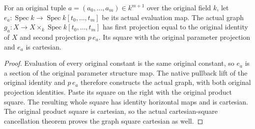 \begin{lemma}
\label{lem:kn-nadel-bertini-evaluation-graph}
\leanok
{}
For an original tuple $a=(a_0,\ldots,a_m)\in k^{m+1}$ over the
original field $k$, let
$e_a:\operatorname{Spec}k\to\operatorname{Spec}k[t_0,\ldots,t_m]$
be its actual evaluation map. The actual graph
$g_a:X\to X\times_k\operatorname{Spec}k[t_0,\ldots,t_m]$ has first
projection equal to the original identity of $X$ and second projection
$p\,e_a$. Its square with the original parameter projection and $e_a$ is
cartesian.
\end{lemma}
\begin{proof}
Evaluation of every original constant is the same original constant, so
$e_a$ is a section of the original parameter structure map. The native
pullback lift of the original identity and $p\,e_a$ therefore constructs
the actual graph, with both original projection identities. Paste its
square on the right with the original product square. The resulting whole
square has identity horizontal maps and is cartesian. The original product
square is cartesian, so the actual cartesian-square cancellation theorem
proves the graph square cartesian as well.
\end{proof}

